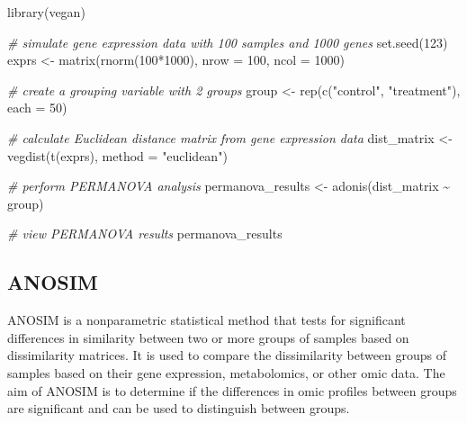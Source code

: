 \documentclass[
]{book}
\newenvironment{Shaded}{\begin{snugshade}}{\end{snugshade}}
\newcommand{\AttributeTok}[1]{\textcolor[rgb]{0.77,0.63,0.00}{#1}}
\newcommand{\CommentTok}[1]{\textcolor[rgb]{0.56,0.35,0.01}{\textit{#1}}}
\newcommand{\DecValTok}[1]{\textcolor[rgb]{0.00,0.00,0.81}{#1}}
\newcommand{\FunctionTok}[1]{\textcolor[rgb]{0.00,0.00,0.00}{#1}}
\newcommand{\NormalTok}[1]{#1}
\newcommand{\OtherTok}[1]{\textcolor[rgb]{0.56,0.35,0.01}{#1}}
\newcommand{\SpecialCharTok}[1]{\textcolor[rgb]{0.00,0.00,0.00}{#1}}
\newcommand{\StringTok}[1]{\textcolor[rgb]{0.31,0.60,0.02}{#1}}
\begin{document}
\begin{Shaded}
\begin{Highlighting}[]
\FunctionTok{library}\NormalTok{(vegan)}

\CommentTok{\# simulate gene expression data with 100 samples and 1000 genes}
\FunctionTok{set.seed}\NormalTok{(}\DecValTok{123}\NormalTok{)}
\NormalTok{exprs }\OtherTok{\textless{}{-}} \FunctionTok{matrix}\NormalTok{(}\FunctionTok{rnorm}\NormalTok{(}\DecValTok{100}\SpecialCharTok{*}\DecValTok{1000}\NormalTok{), }\AttributeTok{nrow =} \DecValTok{100}\NormalTok{, }\AttributeTok{ncol =} \DecValTok{1000}\NormalTok{)}

\CommentTok{\# create a grouping variable with 2 groups}
\NormalTok{group }\OtherTok{\textless{}{-}} \FunctionTok{rep}\NormalTok{(}\FunctionTok{c}\NormalTok{(}\StringTok{"control"}\NormalTok{, }\StringTok{"treatment"}\NormalTok{), }\AttributeTok{each =} \DecValTok{50}\NormalTok{)}

\CommentTok{\# calculate Euclidean distance matrix from gene expression data}
\NormalTok{dist\_matrix }\OtherTok{\textless{}{-}} \FunctionTok{vegdist}\NormalTok{(}\FunctionTok{t}\NormalTok{(exprs), }\AttributeTok{method =} \StringTok{"euclidean"}\NormalTok{)}

\CommentTok{\# perform PERMANOVA analysis}
\NormalTok{permanova\_results }\OtherTok{\textless{}{-}} \FunctionTok{adonis}\NormalTok{(dist\_matrix }\SpecialCharTok{\textasciitilde{}}\NormalTok{ group)}

\CommentTok{\# view PERMANOVA results}
\NormalTok{permanova\_results}
\end{Highlighting}
\end{Shaded}

\hypertarget{anosim}{%
\subsection{ANOSIM}\label{anosim}}

ANOSIM is a nonparametric statistical method that tests for significant differences in similarity between two or more groups of samples based on dissimilarity matrices. It is used to compare the dissimilarity between groups of samples based on their gene expression, metabolomics, or other omic data. The aim of ANOSIM is to determine if the differences in omic profiles between groups are significant and can be used to distinguish between groups.
\end{document}
